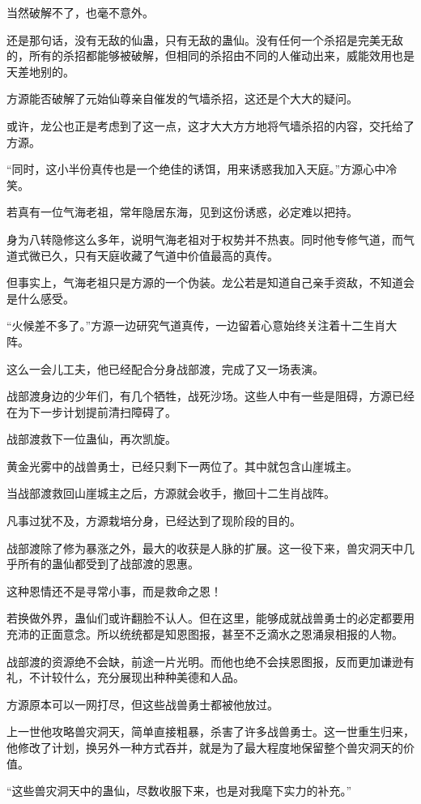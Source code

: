 \begin{this_body}
当然破解不了，也毫不意外。

还是那句话，没有无敌的仙蛊，只有无敌的蛊仙。没有任何一个杀招是完美无敌的，所有的杀招都能够被破解，但相同的杀招由不同的人催动出来，威能效用也是天差地别的。

方源能否破解了元始仙尊亲自催发的气墙杀招，这还是个大大的疑问。

或许，龙公也正是考虑到了这一点，这才大大方方地将气墙杀招的内容，交托给了方源。

“同时，这小半份真传也是一个绝佳的诱饵，用来诱惑我加入天庭。”方源心中冷笑。

若真有一位气海老祖，常年隐居东海，见到这份诱惑，必定难以把持。

身为八转隐修这么多年，说明气海老祖对于权势并不热衷。同时他专修气道，而气道式微已久，只有天庭收藏了气道中价值最高的真传。

但事实上，气海老祖只是方源的一个伪装。龙公若是知道自己亲手资敌，不知道会是什么感受。

“火候差不多了。”方源一边研究气道真传，一边留着心意始终关注着十二生肖大阵。

这么一会儿工夫，他已经配合分身战部渡，完成了又一场表演。

战部渡身边的少年们，有几个牺牲，战死沙场。这些人中有一些是阻碍，方源已经在为下一步计划提前清扫障碍了。

战部渡救下一位蛊仙，再次凯旋。

黄金光雾中的战兽勇士，已经只剩下一两位了。其中就包含山崖城主。

当战部渡救回山崖城主之后，方源就会收手，撤回十二生肖战阵。

凡事过犹不及，方源栽培分身，已经达到了现阶段的目的。

战部渡除了修为暴涨之外，最大的收获是人脉的扩展。这一役下来，兽灾洞天中几乎所有的蛊仙都受到了战部渡的恩惠。

这种恩情还不是寻常小事，而是救命之恩！

若换做外界，蛊仙们或许翻脸不认人。但在这里，能够成就战兽勇士的必定都要用充沛的正面意念。所以统统都是知恩图报，甚至不乏滴水之恩涌泉相报的人物。

战部渡的资源绝不会缺，前途一片光明。而他也绝不会挟恩图报，反而更加谦逊有礼，不计较什么，充分展现出种种美德和人品。

方源原本可以一网打尽，但这些战兽勇士都被他放过。

上一世他攻略兽灾洞天，简单直接粗暴，杀害了许多战兽勇士。这一世重生归来，他修改了计划，换另外一种方式吞并，就是为了最大程度地保留整个兽灾洞天的价值。

“这些兽灾洞天中的蛊仙，尽数收服下来，也是对我麾下实力的补充。”


\end{this_body}
